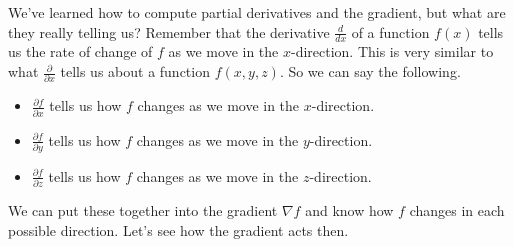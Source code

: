                         We've learned how to compute partial derivatives and the gradient, but what are they really telling us? Remember that the derivative $\frac{d}{dx}$ of a function $f(x)$ tells us the rate of change of $f$ as we move in the $x$-direction.  This is very similar to what $\frac{\partial}{\partial x}$ tells us about a function $f(x,y,z)$.  So we can say the following.
                        \begin{itemize}
                            \item $\frac{\partial f}{\partial x}$ tells us how $f$ changes as we move in the $x$-direction.
                            \item $\frac{\partial f}{\partial y}$ tells us how $f$ changes as we move in the $y$-direction.
                            \item $\frac{\partial f}{\partial z}$ tells us how $f$ changes as we move in the $z$-direction.
                        \end{itemize}
                        
                        We can put these together into the gradient $\nabla f$ and know how $f$ changes in each possible direction. Let's see how the gradient acts then. 
                        
